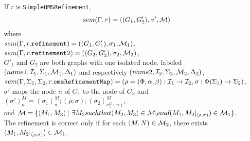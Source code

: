 \documentclass[10pt, a4paper]{isov2}
\newcommand*{\syntax}[1]{\texttt{#1}}
\begin{document}
%

If $r$ is \syntax{SimpleOMSRefinement},
$$sem(\Gamma, r) = 
((G_1,G'_2),\sigma', {\cal M})$$
where\\
 $sem(\Gamma,  r.\syntax{refinement}) = ((G_1,G'_1), \sigma_1,\cM_1)$,\\
 $sem(\Gamma,  r.\syntax{refinement2}) = ((G_2, G'_2),\sigma_2, \cM_2)$,\\ 
 $G'_1$ and $G_2$ are both graphs with one isolated node, labeled
 $(name1,{\cal I}_1,\Sigma_1,{\cal M}_1,\Delta_1)$
 and respectively
 $(name2,{\cal I}_2,\Sigma_2,{\cal M}_2,\Delta_2)$,
 $sem(\Gamma, \Sigma_1, \Sigma_2, r.\syntax{omsRefinementMap}) = (\rho = (\Phi,\alpha,\beta):\cI_1\to\cI_2,\sigma:\Phi(\Sigma_1)\to\Sigma_2)$,\\
 $\sigma'$ maps the node $n$ of $G_1$ to the node of $G_3$ and 
 $(\sigma')^M_n = (\sigma_1)^M_n;(\rho;\sigma);(\sigma_2)^M_{\sigma_1^G(n)}$,\\
 and ${\cal M} = \{ (M_1, M_3)\mid \exists M_2 such that (M_2,M_3) \in {\cal M}_2 and
  (M_1,M_2|_{(\rho,\sigma)}) \in {\cal M}_1 \}$.\\
 The refinement is correct only if
 for each $(M,N)\in{\cal M}_2$, 
 there exists
 $(M_1,M_2|_{(\rho,\sigma)})\in {\cal M}_1$.
 
\end{document}
